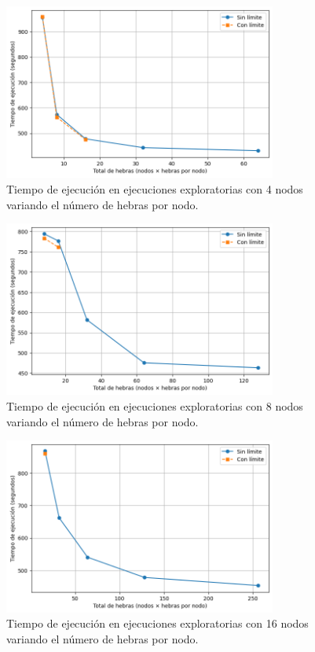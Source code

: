 \begin{figure}[ht]
    \centering
    \includegraphics[width=0.8\textwidth]{imagenes/cap5/exploratory_threads_4nodes.png}
    \caption{Tiempo de ejecución en ejecuciones exploratorias con 4 nodos variando el número de hebras por nodo.}
    \label{fig:exploratory_threads_4nodes}
\end{figure}

\begin{figure}[ht]
    \centering
    \includegraphics[width=0.8\textwidth]{imagenes/cap5/exploratory_threads_8nodes.png}
    \caption{Tiempo de ejecución en ejecuciones exploratorias con 8 nodos variando el número de hebras por nodo.}
    \label{fig:exploratory_threads_8nodes}
\end{figure}

\begin{figure}[ht]
    \centering
    \includegraphics[width=0.8\textwidth]{imagenes/cap5/exploratory_threads_16nodes.png}
    \caption{Tiempo de ejecución en ejecuciones exploratorias con 16 nodos variando el número de hebras por nodo.}
    \label{fig:exploratory_threads_16nodes}
\end{figure}

